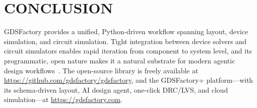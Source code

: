 \documentclass[]{spie}  %
\begin{document}
\section{CONCLUSION}

GDSFactory provides a unified, Python-driven workflow spanning layout, device simulation, and circuit simulation. Tight integration between device solvers and circuit simulators enables rapid iteration from component to system level, and its programmatic, open nature makes it a natural substrate for modern agentic design workflows~\cite{Sharma2025}. The open-source library is freely available at \url{https://github.com/gdsfactory/gdsfactory}, and the GDSFactory+ platform---with its schema-driven layout, AI design agent, one-click DRC/LVS, and cloud simulation---at \url{https://gdsfactory.com}.

\end{document}
